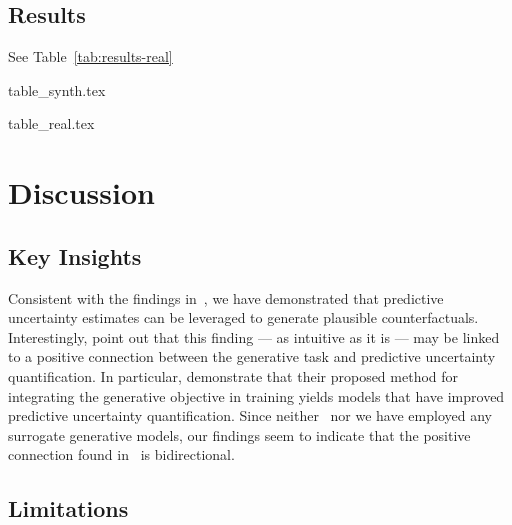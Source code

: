 \documentclass{article}
\begin{document}
\subsection{Results}

See Table~\ref{tab:results-real}

{table_synth.tex}

{table_real.tex}

\section{Discussion}

\subsection{Key Insights}

Consistent with the findings in~\citet{schut2021generating}, we have demonstrated that predictive uncertainty estimates can be leveraged to generate plausible counterfactuals. Interestingly, \citet{schut2021generating} point out that this finding --- as intuitive as it is --- may be linked to a positive connection between the generative task and predictive uncertainty quantification. In particular, \citet{grathwohl2020your} demonstrate that their proposed method for integrating the generative objective in training yields models that have improved predictive uncertainty quantification. Since neither~\citet{schut2021generating} nor we have employed any surrogate generative models, our findings seem to indicate that the positive connection found in~\citet{grathwohl2020your} is bidirectional.

\subsection{Limitations}
\end{document}
